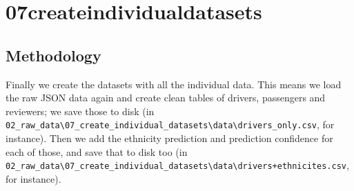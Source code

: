 \documentclass[11pt,a4paper]{article}
\begin{document}
\clearpage %
\section{07\textunderscore create\textunderscore individual\textunderscore datasets}

\subsection{Methodology}
Finally we create the datasets with all the individual data.
This means we load the raw JSON data again and create clean tables of drivers, passengers and reviewers; we save those to disk (in \verb|02_raw_data\07_create_individual_datasets\data\drivers_only.csv|, for instance).
Then we add the ethnicity prediction and prediction confidence for each of those, and save that to disk too (in \verb|02_raw_data\07_create_individual_datasets\data\drivers+ethnicites.csv|, for instance).
\end{document}
